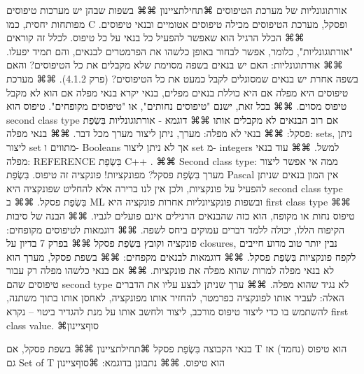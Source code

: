       אורתוגונליות של מערכת הטיפוסים
      ⌘תחילת{ציינון}
      ⌘⌘ בשפות שבהן יש
      מערכות טיפוסים
      מפותחות יחסית, כמו
      C ופסקל, מערכת
      הטיפוסים מכילה
      טיפוסים אטומיים
      ובנאי טיפוסים. 
      ⌘⌘
      הכלל הרגיל הוא
      שאפשר להפעיל כל
      בנאי על כל טיפוס.
      לכלל זה קוראים
      "אורתוגונליות",
      כלומר, אפשר לבחור
      באופן כלשהו את
      הפרמטרים לבנאים,
      והם תמיד יפעלו.
      ⌘⌘ אורתוגונליות: האם יש בנאים בשפה מסוימת שלא מקבלים את כל הטיפוסים? והאם בשפה אחרת יש בנאים שמסוגלים לקבל כמעט את כל הטיפוסים? (פרק 4.1.2).
      ⌘⌘ מערכת טיפוסים היא מפלה אם היא כוללת בנאים מפלים, בנאי יקרא בנאי מפלה אם הוא לא מקבל טיפוס מסוים.
      ⌘⌘ בכל זאת, ישנם "טיפוסים נחותים", או "טיפוסים מקופחים". טיפוס הוא second class type אם רוב הבנאים לא מקבלים אותו
      ⌘⌘ דוגמא - אורתוגונליות בִּשְׂפַת פסקל:
      ⌘⌘ בנאי לא מפלה: מערך, ניתן ליצור מערך מכל דבר.
      ⌘⌘ בנאי מפלה: sets, ניתן ליצור set מתווים ו- Booleans אך לא ניתן ליצור set מ- integers למשל.
      ⌘⌘ עוד בנאי מפלה: REFERENCE בִּשְׂפַת C++ .
      ⌘⌘ Second class type: ממה אי אפשר ליצור מערך בִּשְׂפַת פסקל? מפונקציות! פונקציה זה טיפוס. בִּשְׂפַת Pascal אין המון בנאים שניתן להפעיל על פונקציות, ולכן אין לנו ברירה אלא להחליט שפונקציה היא second class type בִּשְׂפַת פסקל.
      ⌘⌘ ב ML ובשפות פונקציונליות אחרות פונקציה היא first class type
      ⌘⌘ טיפוס נחות או מקופח, הוא כזה שהבנאים הרגילים אינם פועלים לגביו.
      ⌘⌘ הבנה של סיבות הקיפוח הללו, יכולה ללמד דברים עמוקים ביחס לשפה.
      ⌘⌘ דוגמאות לטיפוסים מקופחים: פונקציה וקובץ בִּשְׂפַת פסקל
      ⌘⌘ בפרק 7 בדיון על closures, נבין יותר טוב מדוע חייבים לקפח פונקציות בִּשְׂפַת פסקל.
      ⌘⌘ דוגמאות לבנאים מקפחים:
      ⌘⌘ בשפת פסקל, מערך הוא לא בנאי מפלה למרות שהוא מפלה את פונקציות.
      ⌘⌘ אם בנאי כלשהו מפלה רק עבור טיפוסים שהם second type לא נגיד שהוא מפלה.
      ⌘⌘ ערך שניתן לבצע עליו את הדברים האלה: לעביר אותו לפונקציה כפרמטר, להחזיר אותו מפונקציה, לאחסן אותו בתוך משתנה, להשתמש בו כדי ליצור טיפוס מורכב, ליצור ולחשב אותו על מנת להגדיר ביטוי – נקרא first class value.
    ⌘סוף{ציינון}

      בנאי הקבוצה בִּשְׂפַת פסקל
      ⌘תחילת{ציינון}
      ⌘⌘ בשפת פסקל, אם T הוא טיפוס (נחמד) אז גם Set of T הוא טיפוס.
      ⌘⌘ נתבונן בדוגמא:
    ⌘סוף{ציינון}

